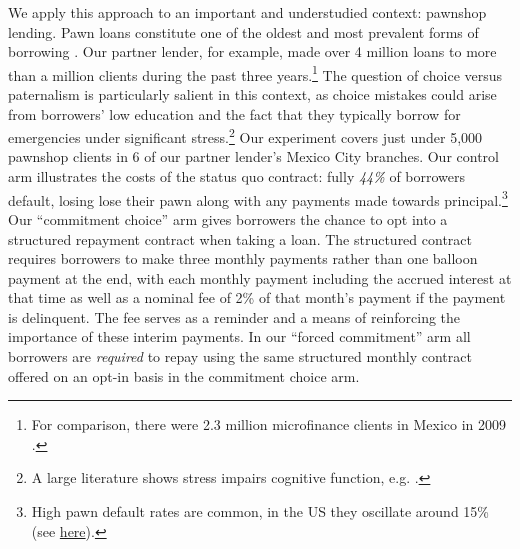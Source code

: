 \documentclass[12pt, a4paper]{article}
\begin{document}
We apply this approach to an important and understudied context: pawnshop lending. 
Pawn loans constitute one of the oldest and most prevalent forms of borrowing \citep{carter2012pawnshops}.
Our partner lender, for example, made over 4 million loans to more than a million clients during the past three years.\footnote{For comparison, there were 2.3 million microfinance clients in Mexico in 2009 \citep{Pedroza:2010}.} 
The question of choice versus paternalism is particularly salient in this context, as choice mistakes could arise from borrowers' low education and the fact that they typically borrow for emergencies under significant stress.\footnote{A large literature shows  stress impairs cognitive function, e.g. \cite{StressReview}.}
Our experiment covers just under 5,000 pawnshop clients in 6 of our partner lender's Mexico City branches. Our control arm illustrates the costs of the status quo contract: fully \emph{44\%} of borrowers default, losing lose their pawn along with any payments made towards principal.\footnote{High pawn default rates are common, in the US they oscillate around 15\% (see \href{https://tinyurl.com/yc2x5bjf}{here}).} Our ``commitment choice'' arm gives borrowers the chance to opt into a structured repayment contract when taking a loan. The structured contract requires borrowers to make three monthly payments rather than one balloon payment at the end, with each monthly payment including the accrued interest at that time as well as a nominal fee of 2\% of that month's payment if the payment is delinquent. The fee serves as a reminder and a means of reinforcing the importance of these interim payments. In our ``forced commitment'' arm all borrowers are \emph{required} to repay using the same structured monthly contract offered on an opt-in basis in the commitment choice arm. 
\end{document}
